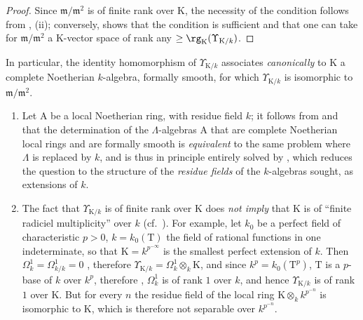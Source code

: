 \begin{proof}
Since $\mathfrak{m}/\mathfrak{m}^2$ is of finite rank over $\mathrm{K}$, the necessity of the condition follows from , (ii); conversely,  shows that the condition is sufficient and that one can take for $\mathfrak{m}/\mathfrak{m}^2$ a $\mathrm{K}$-vector space of rank any $\geq\rg_\mathrm{K}(\Upsilon_{\mathrm{K}/k})$.
\end{proof}

In particular, the identity homomorphism of $\Upsilon_{\mathrm{K}/k}$ associates \emph{canonically} to $\mathrm{K}$ a complete Noetherian $k$-algebra, formally smooth, for which $\Upsilon_{\mathrm{K}/k}$ is isomorphic to $\mathfrak{m}/\mathfrak{m}^2$.

\begin{remark}[22.2.7]
\label{0.22.2.7}
\begin{enumerate}
  \item[\rm{(i)}] Let $\mathrm{A}$ be a local Noetherian ring, with residue field $k$; it follows from  and  that the determination of the $\Lambda$-algebras $\mathrm{A}$ that are complete Noetherian local rings and are formally smooth is \emph{equivalent} to the same problem where $\Lambda$ is replaced by $k$, and is thus in principle entirely solved by , which reduces the question to the structure of the \emph{residue fields} of the $k$-algebras sought, as extensions of $k$.
  \item[\rm{(ii)}] The fact that $\Upsilon_{\mathrm{K}/k}$ is of finite rank over $\mathrm{K}$ does \emph{not imply} that $\mathrm{K}$ is of ``finite radiciel multiplicity'' over $k$ (cf.~).
  For example, let $k_0$ be a perfect field of characteristic $p>0$, $k=k_0(\mathrm{T})$ the field of rational functions in one indeterminate, so that $\mathrm{K}=k^{p^{-\infty}}$ is the smallest perfect extension of $k$.
  Then $\Omega^1_k=\Omega^1_{k/k}=0$ , therefore $\Upsilon_{\mathrm{K}/k}=\Omega^1_k\otimes_k\mathrm{K}$, and since $k^p=k_0(\mathrm{T}^p)$, $\mathrm{T}$ is a $p$-base of $k$ over $k^p$, therefore , $\Omega^1_k$ is of rank $1$ over $k$, and hence $\Upsilon_{\mathrm{K}/k}$ is of rank $1$ over $\mathrm{K}$.
  But for every $n$ the residue field of the local ring $\mathrm{K}\otimes_kk^{p^{-n}}$ is isomorphic to $\mathrm{K}$, which is therefore not separable over $k^{p^{-n}}$.
\end{enumerate}
\end{remark}


